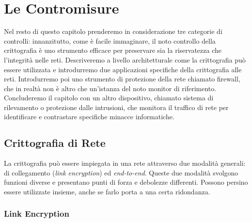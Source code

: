 \documentclass{article}
\begin{document}
\section*{Le Contromisure}

Nel resto di questo capitolo prenderemo in considerazione tre categorie di controlli: innanzitutto, come è facile immaginare, il noto controllo della crittografia è uno strumento efficace per preservare sia la riservatezza che l'integrità nelle reti. Descriveremo a livello architetturale come la crittografia può essere utilizzata e introdurremo due applicazioni specifiche della crittografia alle reti. Introdurremo poi uno strumento di protezione della rete chiamato firewall, che in realtà non è altro che un'istanza del noto monitor di riferimento. Concluderemo il capitolo con un altro dispositivo, chiamato sistema di rilevamento o protezione dalle intrusioni, che monitora il traffico di rete per identificare e contrastare specifiche minacce informatiche.

\subsection*{Crittografia di Rete}

La crittografia può essere impiegata in una rete attraverso due modalità generali: di collegamento (\textit{link encryption}) ed \textit{end-to-end}. Queste due modalità svolgono funzioni diverse e presentano punti di forza e debolezze differenti. Possono persino essere utilizzate insieme, anche se farlo porta a una certa ridondanza.

\subsubsection*{Link Encryption}
\end{document}
